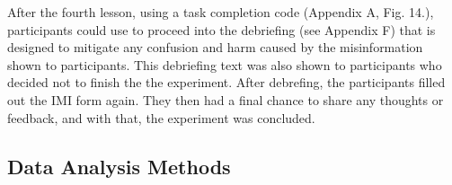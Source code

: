 \documentclass[sigconf]{acmart}
\begin{document}
After the fourth lesson, using a task completion code (Appendix A, Fig. 14.), participants could use to proceed into the debriefing (see Appendix F) that is designed to mitigate any confusion and harm caused by the misinformation shown to participants. 
This debriefing text was also shown to participants who decided not to finish the the experiment. 
After debrefing, the participants filled out the IMI form again. 
They then had a final chance to share any thoughts or feedback, and with that, the experiment was concluded.

\subsection{Data Analysis Methods}




\end{document}
